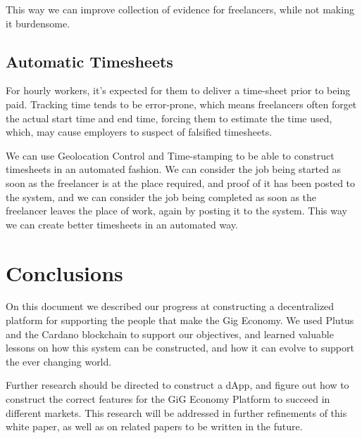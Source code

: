 \documentclass{article}
\begin{document}
This way we can improve collection of evidence for freelancers, while not making it burdensome.

\subsection{Automatic Timesheets}

For hourly workers, it's expected for them to deliver a time-sheet prior to being paid. Tracking time tends to be error-prone, which means freelancers often forget the actual start time and end time, forcing them to estimate the time used, which, may cause employers to suspect of falsified timesheets.

We can use Geolocation Control and Time-stamping to be able to construct timesheets in an automated fashion. We can consider the job being started as soon as the freelancer is at the place required, and proof of it has been posted to the system, and we can consider the job being completed as soon as the freelancer leaves the place of work, again by posting it to the system. This way we can create better timesheets in an automated way.

\section{Conclusions}

On this document we described our progress at constructing a decentralized platform for supporting the people that make the Gig Economy. We used Plutus and the Cardano blockchain to support our objectives, and learned valuable lessons on how this system can be constructed, and how it can evolve to support the ever changing world.

Further research should be directed to construct a dApp, and figure out how to construct the correct features for the GiG Economy Platform to succeed in different markets. This research will be addressed in further refinements of this white paper, as well as on related papers to be written in the future.
\end{document}
